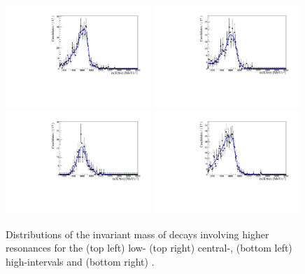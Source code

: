 \begin{figure}[t!]
\centering
\includegraphics[width=0.49\textwidth]{RKst/figs/Fit/fit_EE/rooKeysModel_bkg_partReco_KstEE_low_L0E__for_B0_PV_M.pdf}
\includegraphics[width=0.49\textwidth]{RKst/figs/Fit/fit_EE/rooKeysModel_bkg_partReco_KstEE_central_L0E__for_B0_PV_M.pdf}
\includegraphics[width=0.49\textwidth]{RKst/figs/Fit/fit_EE/rooKeysModel_bkg_partReco_KstEE_high_L0E__for_B0_PV_M.pdf}
\includegraphics[width=0.49\textwidth]{RKst/figs/Fit/fit_EE/rooKeysModel_bkg_partReco_KstGEE_L0E__for_B0_PV_M.pdf}
\caption{Distributions of the \mKpiee invariant mass of decays involving
higher \Kstarz resonances for the (top left) low- (top right) central-, (bottom left) high-\qsq intervals 
and (bottom right) \BdToKstGee.}
\label{fig:misreco}


\end{figure}

